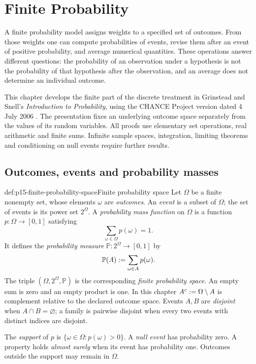 \chapter{Finite Probability}
\label{sec:p15-finite-probability}

A finite probability model assigns weights to a specified set of outcomes.
From those weights one can compute probabilities of events, revise them after
an event of positive probability, and average numerical quantities. These
operations answer different questions: the probability of an observation
under a hypothesis is not the probability of that hypothesis after the
observation, and an average does not determine an individual outcome.

This chapter develops the finite part of the discrete treatment in
Grinstead and Snell's \emph{Introduction to Probability}, using the CHANCE
Project version dated 4 July 2006
\cite[secs.~1.2, 4.1 and 6.1]{GrinsteadSnellChance2006}.
The presentation fixes an underlying outcome space separately from the
values of its random variables. All proofs use elementary set operations,
real arithmetic and finite sums. Infinite sample spaces, integration,
limiting theorems and conditioning on null events require further results.

\section{Outcomes, events and probability masses}
\label{sec:p15-finite-probability-space}

\begin{hbdefinition}{def:p15-finite-probability-space}{Finite probability space}
Let \(\Omega\) be a finite nonempty set, whose elements \(\omega\) are
\emph{outcomes}. An \emph{event} is a subset of \(\Omega\); the set of
events is its power set \(2^\Omega\). A \emph{probability mass function}
on \(\Omega\) is a function \(p:\Omega\to[0,1]\) satisfying
\[
 \sum_{\omega\in\Omega}p(\omega)=1.
\]
It defines the \emph{probability measure}
\(\mathbb P:2^\Omega\to[0,1]\) by
\[
 \mathbb P(A)\mathrel{:=}\sum_{\omega\in A}p(\omega).
\]
The triple \((\Omega,2^\Omega,\mathbb P)\) is the corresponding
\emph{finite probability space}. An empty sum is zero and an empty product
is one. In this chapter \(A^c\mathrel{:=}\Omega\setminus A\) is complement
relative to the declared outcome space. Events \(A,B\) are
\emph{disjoint} when \(A\cap B=\varnothing\); a family is pairwise
disjoint when every two events with distinct indices are disjoint.

The \emph{support} of \(p\) is
\(\{\omega\in\Omega:p(\omega)>0\}\). A \emph{null event} has
probability zero. A property holds \emph{almost surely} when its event has
probability one. Outcomes outside the support may remain in \(\Omega\).
\end{hbdefinition}

